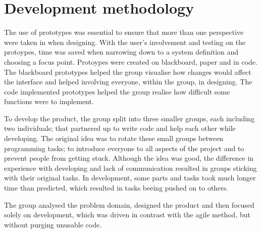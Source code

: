 \section{Development methodology}
The use of prototypes was essential to ensure that more than one perspective were taken in when designing. With the user's involvement and testing on the protoypes, time was saved when narrowing down to a system definition and choosing a focus point. Protoypes were created on blackboard, paper and in code. The blackboard prototypes helped the group visualise how changes would affect the interface and helped involving everyone, within the group, in designing. The code implemented prototypes helped the group realise how difficult some functions were to implement.


To develop the product, the group split into three smaller groups, each including two individuals; that partnered up to write code and help each other while developing.
The original idea was to rotate these small groups between programming tasks; to introduce everyone to all aspects of the project and to prevent people from getting stuck.
Although the idea was good, the difference in experience with developing and lack of communication resulted in groups sticking with their original tasks.
In development, some parts and tasks took much longer time than predicted, which resulted in tasks beeing pushed on to others.


The group analysed the problem domain, designed the product and then focused solely on development, which was driven in contrast with the agile method, but without purging unusable code.

